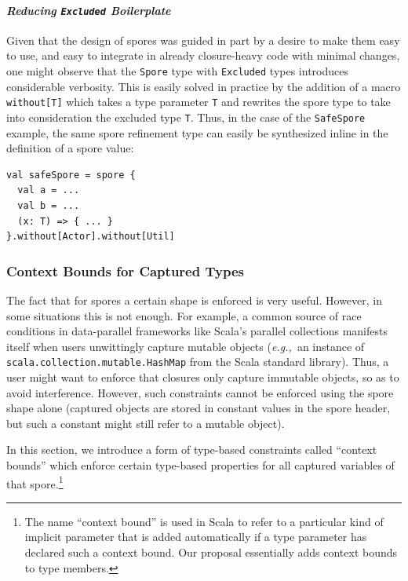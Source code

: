 \documentclass{llncs}
\newcommand{\eg}{{\em e.g.,~}}
\begin{document}
\paragraph{\textbf{\textit{Reducing \texttt{Excluded} Boilerplate}}}

Given that the design of spores was guided in part by a desire to make them
easy to use, and easy to integrate in already closure-heavy code with minimal
changes, one might observe that the \verb|Spore| type with \verb|Excluded|
types introduces considerable verbosity. This is easily solved in practice by
the addition of a macro \verb|without[T]| which takes a type parameter
\verb|T| and rewrites the spore type to take into consideration the excluded
type \verb|T|. Thus, in the case of the \verb|SafeSpore| example, the same spore
refinement type can easily be synthesized inline in the definition of a spore value:

\begin{lstlisting}
val safeSpore = spore {
  val a = ...
  val b = ...
  (x: T) => { ... }
}.without[Actor].without[Util]
\end{lstlisting}

\subsubsection{Context Bounds for Captured Types}
\label{sec:context-bounds}

The fact that for spores a certain shape is enforced is very useful. However,
in some situations this is not enough. For example, a common source of race
conditions in data-parallel frameworks like Scala's parallel collections
manifests itself when users unwittingly capture mutable objects (\eg an
instance of \verb|scala.collection.mutable.HashMap| from the Scala standard
library). Thus, a user might want to enforce that closures only capture
immutable objects, so as to avoid interference. However, such constraints
cannot be enforced using the spore shape alone (captured objects are stored in
constant values in the spore header, but such a constant might still refer to
a mutable object).

In this section, we introduce a form of type-based constraints called
``context bounds'' which enforce certain type-based properties for all
captured variables of that spore.\footnote{The name ``context bound'' is used
in Scala to refer to a particular kind of implicit parameter that is added
automatically if a type parameter has declared such a context bound. Our
proposal essentially adds context bounds to type members.}
\end{document}
